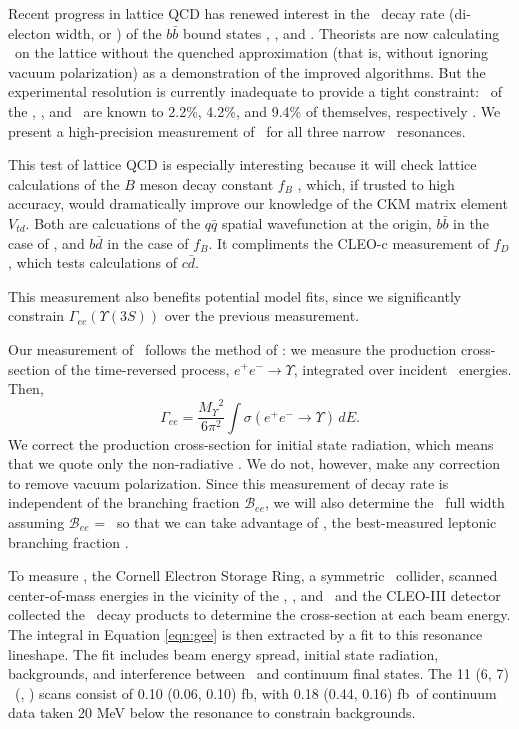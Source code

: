 \documentclass[aps,prl,twocolumn,superscriptaddress,showpacs]{revtex4}
\begin{document}
\maketitle

Recent progress in lattice QCD has renewed interest in the \ee\ decay
rate (di-electon width, or \gee) of the $b\bar{b}$ bound states \us,
\uss, and \usss.  Theorists are now calculating \gee\ on the lattice
without the quenched approximation (that is, without ignoring vacuum
polarization) \cite{latgee} as a demonstration of the improved
algorithms.  But the experimental resolution is currently inadequate
to provide a tight constraint: \gee\ of the \us, \uss, and \usss\ are
known to 2.2\%, 4.2\%, and 9.4\% of themselves, respectively
\cite{pdg}.  We present a high-precision measurement of \gee\ for all
three narrow \ups\ resonances.

This test of lattice QCD is especially interesting because it will
check lattice calculations of the $B$ meson decay constant $f_B$
\cite{latfb}, which, if trusted to high accuracy, would dramatically
improve our knowledge of the CKM matrix element $V_{td}$.  Both are
calcuations of the $q\bar{q}$ spatial wavefunction at the origin,
$b\bar{b}$ in the case of \gee, and $b\bar{d}$ in the case of $f_B$.
It compliments the CLEO-c measurement of $f_D$ \cite{fd}, which tests
calculations of $c\bar{d}$.

This measurement also benefits potential model fits, since we
significantly constrain $\Gamma_{ee}(\Upsilon(3S))$ over the previous
measurement.

Our measurement of \gee\ follows the method of \cite{pdg}: we measure
the production cross-section of the time-reversed process, $e^+e^- \to
\Upsilon$, integrated over incident \ee\ energies.  Then,
\begin{equation}
\label{eqn:gee}
\Gamma_{ee} = \frac{{M_\Upsilon}^2}{6\pi^2}\int \sigma(e^+e^- \to
\Upsilon) \, dE \mbox{.}
\end{equation}
We correct the production cross-section for initial state radiation,
which means that we quote only the non-radiative \gee.  We do not,
however, make any correction to remove vacuum polarization.  Since
this measurement of decay rate is independent of the branching
fraction ${\mathcal B}_{ee}$, we will also determine the \ups\ full
width assuming ${\mathcal B}_{ee}$ = \bmm\ so that we can take
advantage of \bmm, the best-measured leptonic branching fraction
\cite{istvan}.

To measure \gee, the Cornell Electron Storage Ring, a symmetric \ee\
collider, scanned center-of-mass energies in the vicinity of the \us,
\uss, and \usss\ and the CLEO-III detector collected the \ups\ decay
products to determine the cross-section at each beam energy.  The
integral in Equation \ref{eqn:gee} is then extracted by a fit to this
resonance lineshape.  The fit includes beam energy spread, initial
state radiation, backgrounds, and interference between \ups\ and
continuum final states.  The 11 (6, 7) \us\ (\uss, \usss) scans
consist of 0.10 (0.06, 0.10) fb\inv, with 0.18 (0.44, 0.16) fb\inv\ of
continuum data taken 20 MeV below the resonance to constrain
backgrounds.
\end{document}
